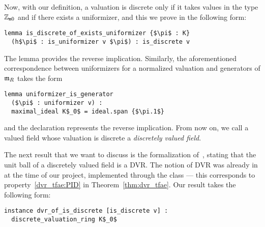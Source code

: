 \documentclass[sigplan,10pt, nonacm, review]{acmart}
\begin{document}
Now, with our definition, a valuation is discrete only if it takes values in the type $\mathbb{Z}_{\mathtt{m}0}$ and if there exists a uniformizer, and this we prove in the following form\href{https://github.com/LCFT-Lean/local_fields/blob/76ad487d09babdb0018f394a5634526637ee014a/src/discrete_valuation_ring/basic.lean#L160}{\extlink}:
\begin{lstlisting}
lemma is_discrete_of_exists_uniformizer {$\pi$ : K} 
  (h$\pi$ : is_uniformizer v $\pi$) : is_discrete v
\end{lstlisting}
The lemma \href{https://github.com/LCFT-Lean/local_fields/blob/76ad487d09babdb0018f394a5634526637ee014a/src/discrete_valuation_ring/basic.lean#L320}{\extlink} provides the reverse implication. Similarly, the aforementioned correspondence between uniformizers for a normalized valuation and generators of $\mathfrak{m}_{R}$ takes the form\href{https://github.com/LCFT-Lean/local_fields/blob/76ad487d09babdb0018f394a5634526637ee014a/src/discrete_valuation_ring/basic.lean#L291}{\extlink}
\begin{lstlisting}
lemma uniformizer_is_generator 
  ($\pi$ : uniformizer v) :
  maximal_ideal K$_0$ = ideal.span {$\pi.1$}
\end{lstlisting}
and the declaration \href{https://github.com/LCFT-Lean/local_fields/blob/76ad487d09babdb0018f394a5634526637ee014a/src/discrete_valuation_ring/basic.lean#L344}{\extlink} represents the reverse implication. From now on, we call a valued field whose valuation is discrete a \emph{discretely valued field}.

The next result that we want to discuss is the formalization of~\cite[Chapitre~I, \S1, Proposition~1]{Ser62}, stating that the unit ball of a discretely valued field is a DVR. The notion of DVR was already in \mathlib at the time of our project, implemented through the class \href{https://leanprover-community.github.io/mathlib_docs/ring_theory/discrete_valuation_ring/basic.html#discrete_valuation_ring}{\extlink} --- this corresponds to property~\ref{dvr_tfae:PID} in Theorem~\ref{thm:dvr_tfae}. Our result takes the following form\href{https://github.com/LCFT-Lean/local_fields/blob/76ad487d09babdb0018f394a5634526637ee014a/src/discrete_valuation_ring/basic.lean#L434}{\extlink}:
\begin{lstlisting}[caption={The unit ball is a DVR if the valuation is discrete.}, label={code:serre_prop_1}]
instance dvr_of_is_discrete [is_discrete v] :
  discrete_valuation_ring K$_0$
\end{lstlisting}
\end{document}
